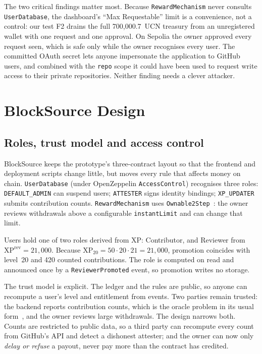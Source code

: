 \documentclass[conference]{IEEEtran}
\newcommand{\XP}{\mathrm{XP}}
\begin{document}
The two critical findings matter most. Because \texttt{RewardMechanism} never consults \texttt{UserDatabase}, the dashboard's ``Max Requestable'' limit is a convenience, not a control: our test F2 drains the full 700{,}000.7~UCN treasury from an unregistered wallet with one request and one approval. On Sepolia the owner approved every request seen, which is safe only while the owner recognises every user. The committed OAuth secret lets anyone impersonate the application to GitHub users, and combined with the \texttt{repo} scope it could have been used to request write access to their private repositories. Neither finding needs a clever attacker.

\section{BlockSource Design}\label{sec:design}

\subsection{Roles, trust model and access control}\label{sec:trust}
BlockSource keeps the prototype's three-contract layout so that the frontend and deployment scripts change little, but moves every rule that affects money on chain. \texttt{UserDatabase} (under OpenZeppelin \texttt{AccessControl}) recognises three roles: \texttt{DEFAULT\_ADMIN} can suspend users; \texttt{ATTESTER} signs identity bindings; \texttt{XP\_UPDATER} submits contribution counts. \texttt{RewardMechanism} uses \texttt{Ownable2Step}~\cite{woehrer2018patterns}: the owner reviews withdrawals above a configurable \texttt{instantLimit} and can change that limit.

Users hold one of two roles derived from XP: Contributor, and Reviewer from $\XP^{\mathrm{rev}} = 21{,}000$. Because $\XP_{20} = 50 \cdot 20 \cdot 21 = 21{,}000$, promotion coincides with level~20 and 420 counted contributions. The role is computed on read and announced once by a \texttt{ReviewerPromoted} event, so promotion writes no storage.

The trust model is explicit. The ledger and the rules are public, so anyone can recompute a user's level and entitlement from events. Two parties remain trusted: the backend reports contribution counts, which is the oracle problem in its usual form~\cite{caldarelli2020oracle}, and the owner reviews large withdrawals. The design narrows both. Counts are restricted to public data, so a third party can recompute every count from GitHub's API and detect a dishonest attester; and the owner can now only \emph{delay or refuse} a payout, never pay more than the contract has credited.
\end{document}
